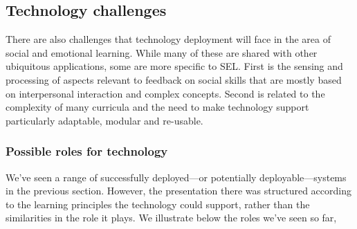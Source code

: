 \documentclass[prodmode,acmtochi]{acmsmall}
\newcommand{\rephrase}[1]{\textrm{\textrm{\textcolor{gray}{#1}}}}
\begin{document}
\subsection{Technology challenges}
\label{sec:techAspect}
 There are also challenges that technology deployment will face in the area of social and emotional learning. While many of these are shared with other ubiquitous applications, some are more specific to SEL. First is the sensing and processing of aspects relevant to feedback on social skills that are mostly based on interpersonal interaction and complex concepts. Second is related to the complexity of many curricula and the need to make technology support particularly adaptable, modular and re-usable. 

\iffalse
\subsubsection{Possible roles for technology}   We've seen a range of successfully deployed---or potentially deployable---systems in the previous section. However, the presentation there was structured according to the learning principles the technology could support, rather than the similarities in the role it plays. We illustrate below the roles we've seen so far, 
\end{document}
